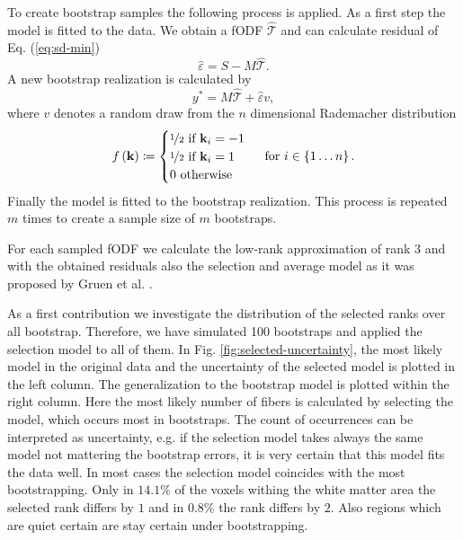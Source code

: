To create bootstrap samples the following process is applied. As a first step the model is fitted to the data. We obtain a fODF
$\hat{\mathcal{T}}$ and can calculate residual of Eq. (\ref{eq:sd-min}) 
\[ \hat{\varepsilon} = S - M\hat{\mathcal{T}} .\] 
A new bootstrap realization is calculated by 
\[ y^{*} = M\hat{\mathcal{T}}  + \hat{\varepsilon} v , \]
where $v$ denotes a random draw from the $n$ dimensional Rademacher distribution
\[ f \left( \mathbf{k} \right) \coloneqq  \begin{cases} \nicefrac{1}{2} \text{ if }
		\mathbf{k}_i=-1 \\
		\nicefrac{1}{2} \text{ if } \mathbf{k}_i=1 \\
		0 \text { otherwise } 
\end{cases} \text{ for } i \in \left\{ 1\dots n \right\} . \]
 Finally the model is fitted to the bootstrap realization. This process is repeated $m$
times to create a sample size of $m$ bootstraps.

For each sampled fODF we calculate the low-rank approximation of rank $3$
and with the obtained residuals also the selection and average model as it was
proposed by Gruen et al. \cite{Gruen:2021}.

As a first contribution we investigate the distribution of the selected ranks
over all bootstrap. Therefore, we have simulated 100 bootstraps and applied the
selection model to all of them. In Fig. \ref{fig:selected-uncertainty}, the most
likely model in the original data and the uncertainty of the selected model is
plotted in the left column. The generalization to the bootstrap model is
plotted within the right column. Here the most likely number of fibers is
calculated by selecting the model, which occurs most in bootstraps. The count of
occurrences can be interpreted as uncertainty, e.g. if the selection model takes
always the same model not mattering the bootstrap errors, it is very certain
that this model fits the data well.  
In most cases the selection model coincides with the most bootstrapping. Only in
$14.1\%$ of the voxels withing the white matter area the selected rank differs
by $1$ and in $0.8\%$ the rank differs by $2$. Also regions which are quiet
certain are stay certain under bootstrapping.


